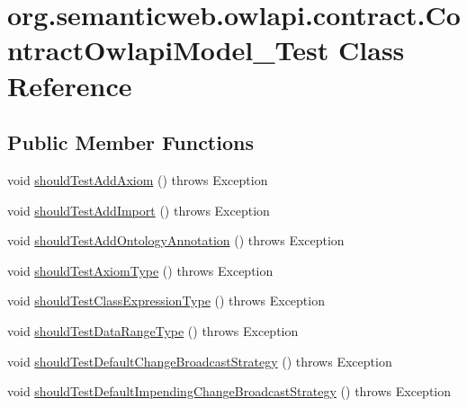 \hypertarget{classorg_1_1semanticweb_1_1owlapi_1_1contract_1_1_contract_owlapi_model__1_test}{\section{org.\-semanticweb.\-owlapi.\-contract.\-Contract\-Owlapi\-Model\-\_\-Test Class Reference}
\label{classorg_1_1semanticweb_1_1owlapi_1_1contract_1_1_contract_owlapi_model__1_test}
}
\subsection*{Public Member Functions}
\begin{DoxyCompactItemize}
\item 
void \hyperlink{classorg_1_1semanticweb_1_1owlapi_1_1contract_1_1_contract_owlapi_model__1_test_a29adfcd0299149726e5af000f44cd2a0}{should\-Test\-Add\-Axiom} ()  throws Exception 
\item 
void \hyperlink{classorg_1_1semanticweb_1_1owlapi_1_1contract_1_1_contract_owlapi_model__1_test_a39f7afa1961d5bc29cbe041a9a72bd81}{should\-Test\-Add\-Import} ()  throws Exception 
\item 
void \hyperlink{classorg_1_1semanticweb_1_1owlapi_1_1contract_1_1_contract_owlapi_model__1_test_a111c44931244ff959445886630d3c4c2}{should\-Test\-Add\-Ontology\-Annotation} ()  throws Exception 
\item 
void \hyperlink{classorg_1_1semanticweb_1_1owlapi_1_1contract_1_1_contract_owlapi_model__1_test_aa4db662d575ec9cf74123a30cb48188b}{should\-Test\-Axiom\-Type} ()  throws Exception 
\item 
void \hyperlink{classorg_1_1semanticweb_1_1owlapi_1_1contract_1_1_contract_owlapi_model__1_test_af26995964a7c98d06db8a534e489c0ce}{should\-Test\-Class\-Expression\-Type} ()  throws Exception 
\item 
void \hyperlink{classorg_1_1semanticweb_1_1owlapi_1_1contract_1_1_contract_owlapi_model__1_test_a8c79751108889fd9ebc7067ed61600b6}{should\-Test\-Data\-Range\-Type} ()  throws Exception 
\item 
void \hyperlink{classorg_1_1semanticweb_1_1owlapi_1_1contract_1_1_contract_owlapi_model__1_test_a1b9fd0d96543ec7bb961385c38a13c60}{should\-Test\-Default\-Change\-Broadcast\-Strategy} ()  throws Exception 
\item 
void \hyperlink{classorg_1_1semanticweb_1_1owlapi_1_1contract_1_1_contract_owlapi_model__1_test_aed84dfe4a20387d2715b8f882cc551f5}{should\-Test\-Default\-Impending\-Change\-Broadcast\-Strategy} ()  throws Exception 

\end{DoxyCompactItemize}
